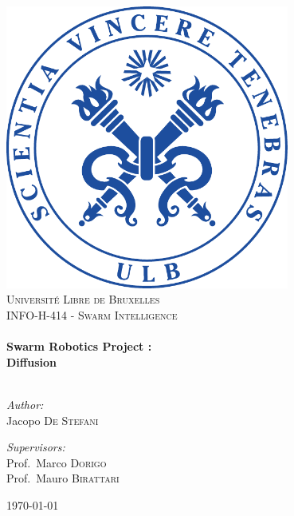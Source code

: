 \begin{titlepage}

\begin{center}


\includegraphics[width=0.70\textwidth]{./Figures/logo-ulb}\\[1cm]    

\textsc{\LARGE Université Libre de Bruxelles}\\[1.5cm]

\textsc{\Large INFO-H-414 - Swarm Intelligence}\\[0.5cm]


\HRule \\[0.4cm]
{ \huge \bfseries Swarm Robotics Project : \\ Diffusion}\\[0.4cm]

\HRule \\[1cm]

\begin{minipage}{0.4\textwidth}
\begin{flushleft} \large
\emph{Author:}\\
Jacopo  \textsc{De Stefani}
\end{flushleft}
\end{minipage}
\begin{minipage}{0.4\textwidth}
\begin{flushright} \large
\emph{Supervisors:} \\
Prof.~Marco \textsc{Dorigo}\\
Prof.~Mauro \textsc{Birattari}
\end{flushright}
\end{minipage}

\vfill

{\large \today}

\end{center}

\end{titlepage}
